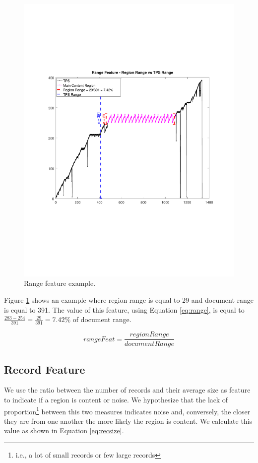 \begin{figure}[h]
  \centering
     \includegraphics[trim={2.5cm 7.4cm 2.2cm 7.4cm}, clip,  width=\columnwidth]{img/range.pdf}
  \caption{Range feature example.}
  \label{fig:range}
\end{figure}

Figure \ref{fig:range} shows an example where region range is equal to 29 and
document range is equal to 391. The value of this feature, using Equation
\ref{eq:range}, is equal to $\frac{283-254}{391}=\frac{29}{391}=7.42\%$ of
document range.

\begin{equation}\label{eq:range}
    rangeFeat = \frac{regionRange}{documentRange}
\end{equation}

\subsection{Record Feature}\label{ss:rec}
We use the ratio between the number of records and their average size as feature
to indicate if a region is content or noise. We hypothesize that the lack of
proportion\footnote{i.e., a lot of small records or few large records} between
this two measures indicates noise and, conversely, the closer they are from one
another the more likely the region is content. We calculate this value as shown
in Equation \ref{eq:recsize}.

